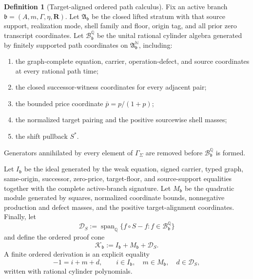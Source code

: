 \documentclass[11pt]{article}
\numberwithin{section}{part}
\theoremstyle{plain}
\theoremstyle{definition}
\newtheorem{definition}[definition]{Definition}
\theoremstyle{remark}
\begin{document}
\begin{definition}[Target-aligned ordered path calculus]
\label{def:target-aligned-ordered-path-calculus}
Fix an active branch
\(\mathfrak b=(A,m,\Gamma,\eta,\mathbf R)\).  Let
\(\mathfrak A_{\mathfrak b}\) be the closed lifted stratum with that source
support, realization mode, shell family and floor, origin tag, and all prior
zero transcript coordinates.  Let
\(\mathcal B_{\mathfrak b}^{\mathbb Q}\) be the unital rational cylinder
algebra generated by finitely supported path coordinates on
\(\mathfrak A_{\mathfrak b}^{\mathbb N}\), including:
\begin{enumerate}[label=\textup{(\alph*)}]
\item the graph-complete equation, carrier, operation-defect, and source
coordinates at every rational path time;
\item the closed successor-witness coordinates for every adjacent pair;
\item the bounded price coordinate \(\bar p=p/(1+p)\);
\item the normalized target pairing and the positive sourcewise shell masses;
\item the shift pullback \(S^*\).
\end{enumerate}
Generators annihilated by every element of \(\Gamma_\Sigma\) are removed
before \(\mathcal B_{\mathfrak b}^{\mathbb Q}\) is formed.

Let \(I_{\mathfrak b}\) be the ideal generated by the weak equation, signed carrier,
typed graph, same-origin, successor, zero-price, target-floor, and
source-support equalities together with the complete active-branch signature.
Let \(M_{\mathfrak b}\) be the quadratic module
generated by squares, normalized coordinate bounds, nonnegative production
and defect masses, and the positive target-alignment coordinates.  Finally,
let
\[
 \mathcal D_S
 :=\operatorname{span}_{\mathbb Q}
 \{f\circ S-f:f\in\mathcal B_{\mathfrak b}^{\mathbb Q}\}
\]
and define the ordered proof cone
\begin{equation}
 \label{eq:target-aligned-proof-cone}
 \mathcal K_{\mathfrak b}:=
 I_{\mathfrak b}+M_{\mathfrak b}+\mathcal D_S.
\end{equation}
A finite ordered derivation is an explicit equality
\[
 -1=i+m+d,\qquad
 i\in I_{\mathfrak b},\quad m\in M_{\mathfrak b},\quad d\in\mathcal D_S,
\]
written with rational cylinder polynomials.
\end{definition}
\end{document}
